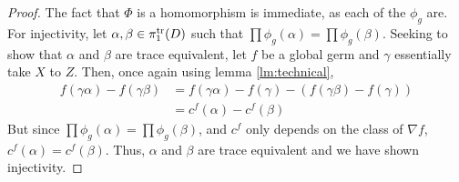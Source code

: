 \begin{proof}
  The fact that \(\Phi\) is a homomorphism is immediate, as each of the
  \(\phi_g\) are. For injectivity,
  let \(\alpha,\beta \in \pi_1^{\operatorname{tr}}(D)\) such that \(\prod\phi_g(\alpha)=\prod\phi_g(\beta)\). Seeking to show that
  \(\alpha\) and \(\beta\) are trace equivalent, let \(f\) be a global germ and
  \(\gamma\) essentially take \(X\) to \(Z\). Then, once again using lemma \ref{lm:technical},
  \begin{align*}
    f(\gamma\alpha)-f(\gamma\beta) &= f(\gamma\alpha) - f(\gamma) - \left( f(\gamma\beta)-f(\gamma) \right) \\
                &= c^f(\alpha) - c^f(\beta)
  \end{align*}
  But since \(\prod\phi_g(\alpha)=\prod\phi_g(\beta)\), and \(c^f\) only depends
  on the class of \(\nabla f\),
  \(c^f(\alpha) = c^f(\beta)\). Thus, \(\alpha\) and \(\beta\) are trace
  equivalent and we have shown injectivity.
\end{proof}

